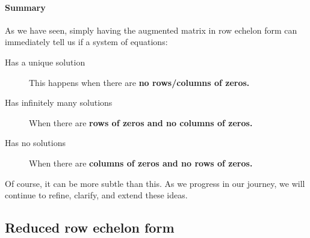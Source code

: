 \documentclass{ximera}
\begin{document}
\paragraph{Summary}

As we have seen, simply having the augmented matrix in row echelon form can immediately tell us if a system of equations:
\begin{description}
\item[Has a unique solution] This happens when there are \textbf{no rows/columns of zeros.}
\item[Has infinitely many solutions] When there are \textbf{rows of zeros and no columns of zeros.}
\item[Has no solutions] When there are  \textbf{columns of zeros and no rows of zeros.}
\end{description}
Of course, it can be more subtle than this. As we progress in our
journey, we will continue to refine, clarify, and extend these ideas.





\subsection{Reduced row echelon form}
\end{document}
